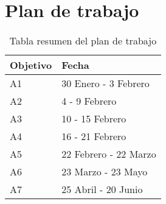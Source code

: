 \section{Plan de trabajo}
\label{2:sec:2}

\begin{table}[!ht]
\begin{center}
\begin{tabular}{|p{25mm}|p{50mm}|} \hline 
\textbf{Objetivo} & \textbf{Fecha} \\ \hline

A1 &30 Enero - 3 Febrero \\
\hline

A2 & 4 - 9 Febrero 
\\
\hline

A3 & 10 - 15 Febrero 
\\
\hline

A4 & 
16 - 21 Febrero 
\\
\hline

A5 & 
22 Febrero - 22 Marzo 
\\
\hline

A6 & 
23 Marzo - 23 Mayo
\\
\hline

A7 &
25 Abril - 20 Junio
\\
\hline

\end{tabular}
\end{center}
\caption{Tabla resumen del plan de trabajo}
\label{table:resOthers}
\end{table}